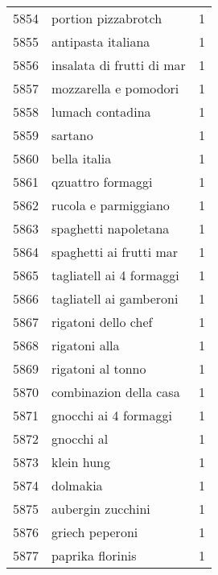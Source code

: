 \begin{tabular}{llr}
5854 &                                portion pizzabrotch &      1 \\
5855 &                                 antipasta italiana &      1 \\
5856 &                          insalata di frutti di mar &      1 \\
5857 &                              mozzarella e pomodori &      1 \\
5858 &                                   lumach contadina &      1 \\
5859 &                                            sartano &      1 \\
5860 &                                       bella italia &      1 \\
5861 &                                  qzuattro formaggi &      1 \\
5862 &                               rucola e parmiggiano &      1 \\
5863 &                               spaghetti napoletana &      1 \\
5864 &                            spaghetti ai frutti mar &      1 \\
5865 &                           tagliatell ai 4 formaggi &      1 \\
5866 &                            tagliatell ai gamberoni &      1 \\
5867 &                                rigatoni dello chef &      1 \\
5868 &                                      rigatoni alla &      1 \\
5869 &                                  rigatoni al tonno &      1 \\
5870 &                             combinazion della casa &      1 \\
5871 &                              gnocchi ai 4 formaggi &      1 \\
5872 &                                         gnocchi al &      1 \\
5873 &                                         klein hung &      1 \\
5874 &                                           dolmakia &      1 \\
5875 &                                  aubergin zucchini &      1 \\
5876 &                                    griech peperoni &      1 \\
5877 &                                   paprika florinis &      1 \\

\end{tabular}
